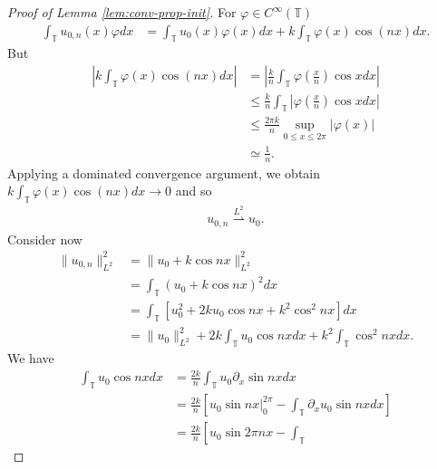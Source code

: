 \documentclass[12pt,reqno]{amsart}
\numberwithin{equation}{section}  %
\newcommand{\ci}{\mathbb{T}}
\newcommand{\p}{\partial}
\newcommand{\vp}{\varphi}
\begin{document}
%
\begin{proof}[Proof of Lemma \ref{lem:conv-prop-init}]
For $\vp \in C^{\infty}(\ci)$
%
%
\begin{equation*}
\begin{split}
  \int_{\ci} u_{0,n}(x) \vp dx
  & = \int_{\ci} u_{0}(x) \vp(x) dx + k \int_{\ci} \vp(x) \cos(nx) dx.
\end{split}
\end{equation*}
%
%
But
%
%
\begin{equation*}
\begin{split}
| k \int_{\ci} \vp(x) \cos(nx) dx | 
& = | \frac{k}{n} \int_{\ci} \vp \left ( \frac{x}{n} \right )  \cos x dx|
\\
& \le \frac{k}{n} \int_{\ci} | \vp\left( \frac{x}{n} \right) \cos x dx | 
\\
& \le \frac{2 \pi k}{n} \sup_{0 \le x \le 2 \pi} | \vp(x) | 
\\
& \simeq \frac{1}{n}.
\end{split}
\end{equation*}
%
%
Applying a dominated convergence argument, we obtain $k \int_{\ci} \vp(x)
\cos(nx) dx \to 0$ and so
%
%
\begin{equation*}
\begin{split}
  u_{0,n} \overset{L^{2}}{\rightharpoonup} u_{0}.
\end{split}
\end{equation*}
Consider now
%
%
\begin{equation*}
\begin{split}
  \| u_{0,n} \|_{L^{2}}^{2} 
  & = \| u_{0}  + k \cos nx \|_{L^{2}}^{2}
  \\
  & = \int_{\ci} \left( u_{0} + k \cos nx \right)^{2} dx
  \\
  & = \int_{\ci} \left[ u_{0}^{2} + 2k u_{0} \cos nx + k^{2} \cos^{2}nx
  \right]dx
  \\
  & = \| u_{0} \|_{L^{2}}^{2} + 2k \int_{\ci} u_{0} \cos nx dx + k^{2}
  \int_{\ci} \cos^{2}nx dx.
\end{split}
\end{equation*}
%
%
We have
%
%
\begin{equation*}
\begin{split}
  \int_{\ci} u_{0} \cos nx dx 
  & = \frac{2k}{n} \int_{\ci} u_{0} \p_{x} \sin nx dx
  \\
  & = \frac{2k}{n} \left[ u_{0} \sin nx \vert_{0}^{2\pi} - \int_{\ci}
  \p_{x}u_{0} \sin nx dx \right]
  \\
  & = \frac{2k}{n} \left[ u_{0} \sin 2\pi nx - \int_{\ci}

\end{split}
\end{equation*}
\end{proof}
\end{document}
